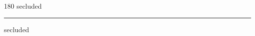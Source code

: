 
\begin{frame}
\begin{center}
\begin{turn}{180}
{\fontsize{2.5cm}{1em}\selectfont secluded}
\end{turn}
\vspace{1em}\par  
\hrule
\vspace{1em}\par  
{\fontsize{2.5cm}{1em}\selectfont secluded}
\end{center}
\end{frame}

